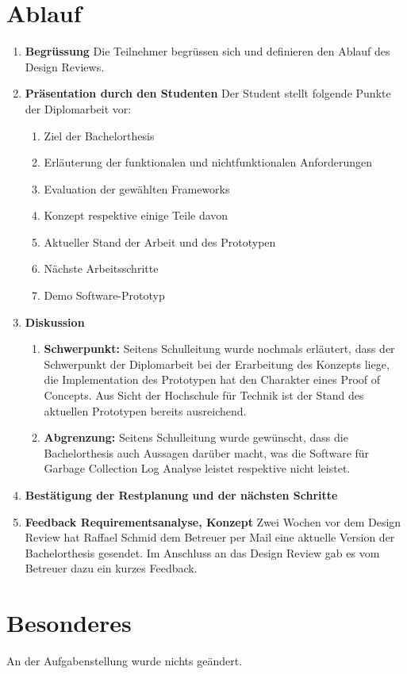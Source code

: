 \section{Ablauf}
\begin{enumerate} 
\item \textbf{Begrüssung} \newline
	Die Teilnehmer begrüssen sich und definieren den Ablauf des Design Reviews.
\item \textbf{Präsentation durch den Studenten} \newline
	Der Student stellt folgende Punkte der Diplomarbeit vor:
	\begin{enumerate}
		\item Ziel der Bachelorthesis
		\item Erläuterung der funktionalen und nichtfunktionalen Anforderungen
		\item Evaluation der gewählten Frameworks
		\item Konzept respektive einige Teile davon
		\item Aktueller Stand der Arbeit und des Prototypen
		\item Nächste Arbeitsschritte
		\item Demo Software-Prototyp
	\end{enumerate}
\item \textbf{Diskussion}
	\begin{enumerate}
		\item \textbf{Schwerpunkt:} Seitens Schulleitung wurde nochmals erläutert, dass der Schwerpunkt der Diplomarbeit bei der Erarbeitung des Konzepts liege, die Implementation des Prototypen hat den Charakter eines Proof of Concepts. Aus Sicht der Hochschule für Technik ist der Stand des aktuellen Prototypen bereits ausreichend.
		\item \textbf{Abgrenzung: } Seitens Schulleitung wurde gewünscht, dass die Bachelorthesis auch Aussagen darüber macht, was die  Software für Garbage Collection Log Analyse leistet respektive nicht leistet.
	\end{enumerate}
	\item \textbf{Bestätigung der Restplanung und der nächsten Schritte}
	\item \textbf{Feedback Requirementsanalyse, Konzept}\newline
		 Zwei Wochen vor dem Design Review hat Raffael Schmid dem Betreuer per Mail eine aktuelle Version der Bachelorthesis gesendet. Im Anschluss an das Design Review gab es vom Betreuer dazu ein kurzes Feedback.
\end{enumerate}
\section{Besonderes}\label{besonderes}
An der Aufgabenstellung wurde nichts geändert.


